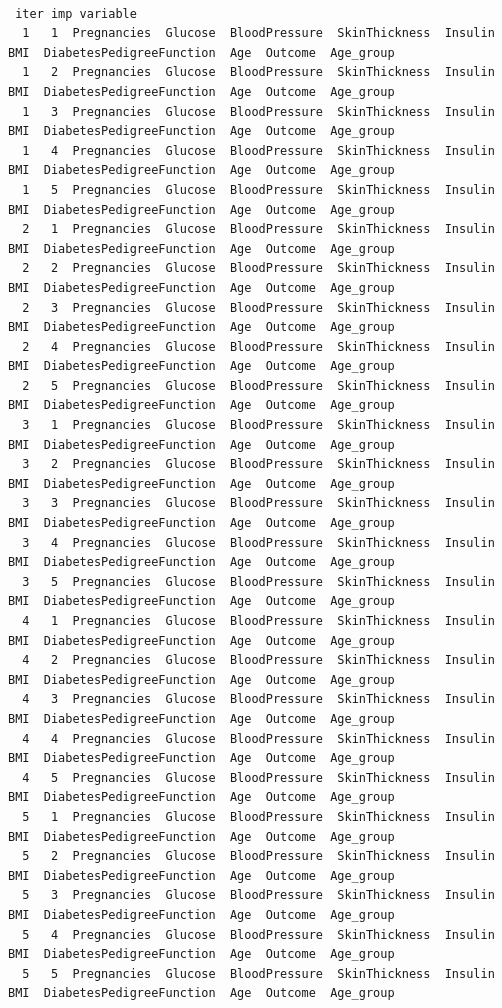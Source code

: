 \documentclass[
  letterpaper,
  DIV=11,
  numbers=noendperiod]{scrreprt}
\begin{document}
\begin{verbatim}

 iter imp variable
  1   1  Pregnancies  Glucose  BloodPressure  SkinThickness  Insulin  BMI  DiabetesPedigreeFunction  Age  Outcome  Age_group
  1   2  Pregnancies  Glucose  BloodPressure  SkinThickness  Insulin  BMI  DiabetesPedigreeFunction  Age  Outcome  Age_group
  1   3  Pregnancies  Glucose  BloodPressure  SkinThickness  Insulin  BMI  DiabetesPedigreeFunction  Age  Outcome  Age_group
  1   4  Pregnancies  Glucose  BloodPressure  SkinThickness  Insulin  BMI  DiabetesPedigreeFunction  Age  Outcome  Age_group
  1   5  Pregnancies  Glucose  BloodPressure  SkinThickness  Insulin  BMI  DiabetesPedigreeFunction  Age  Outcome  Age_group
  2   1  Pregnancies  Glucose  BloodPressure  SkinThickness  Insulin  BMI  DiabetesPedigreeFunction  Age  Outcome  Age_group
  2   2  Pregnancies  Glucose  BloodPressure  SkinThickness  Insulin  BMI  DiabetesPedigreeFunction  Age  Outcome  Age_group
  2   3  Pregnancies  Glucose  BloodPressure  SkinThickness  Insulin  BMI  DiabetesPedigreeFunction  Age  Outcome  Age_group
  2   4  Pregnancies  Glucose  BloodPressure  SkinThickness  Insulin  BMI  DiabetesPedigreeFunction  Age  Outcome  Age_group
  2   5  Pregnancies  Glucose  BloodPressure  SkinThickness  Insulin  BMI  DiabetesPedigreeFunction  Age  Outcome  Age_group
  3   1  Pregnancies  Glucose  BloodPressure  SkinThickness  Insulin  BMI  DiabetesPedigreeFunction  Age  Outcome  Age_group
  3   2  Pregnancies  Glucose  BloodPressure  SkinThickness  Insulin  BMI  DiabetesPedigreeFunction  Age  Outcome  Age_group
  3   3  Pregnancies  Glucose  BloodPressure  SkinThickness  Insulin  BMI  DiabetesPedigreeFunction  Age  Outcome  Age_group
  3   4  Pregnancies  Glucose  BloodPressure  SkinThickness  Insulin  BMI  DiabetesPedigreeFunction  Age  Outcome  Age_group
  3   5  Pregnancies  Glucose  BloodPressure  SkinThickness  Insulin  BMI  DiabetesPedigreeFunction  Age  Outcome  Age_group
  4   1  Pregnancies  Glucose  BloodPressure  SkinThickness  Insulin  BMI  DiabetesPedigreeFunction  Age  Outcome  Age_group
  4   2  Pregnancies  Glucose  BloodPressure  SkinThickness  Insulin  BMI  DiabetesPedigreeFunction  Age  Outcome  Age_group
  4   3  Pregnancies  Glucose  BloodPressure  SkinThickness  Insulin  BMI  DiabetesPedigreeFunction  Age  Outcome  Age_group
  4   4  Pregnancies  Glucose  BloodPressure  SkinThickness  Insulin  BMI  DiabetesPedigreeFunction  Age  Outcome  Age_group
  4   5  Pregnancies  Glucose  BloodPressure  SkinThickness  Insulin  BMI  DiabetesPedigreeFunction  Age  Outcome  Age_group
  5   1  Pregnancies  Glucose  BloodPressure  SkinThickness  Insulin  BMI  DiabetesPedigreeFunction  Age  Outcome  Age_group
  5   2  Pregnancies  Glucose  BloodPressure  SkinThickness  Insulin  BMI  DiabetesPedigreeFunction  Age  Outcome  Age_group
  5   3  Pregnancies  Glucose  BloodPressure  SkinThickness  Insulin  BMI  DiabetesPedigreeFunction  Age  Outcome  Age_group
  5   4  Pregnancies  Glucose  BloodPressure  SkinThickness  Insulin  BMI  DiabetesPedigreeFunction  Age  Outcome  Age_group
  5   5  Pregnancies  Glucose  BloodPressure  SkinThickness  Insulin  BMI  DiabetesPedigreeFunction  Age  Outcome  Age_group
\end{verbatim}
\end{document}
